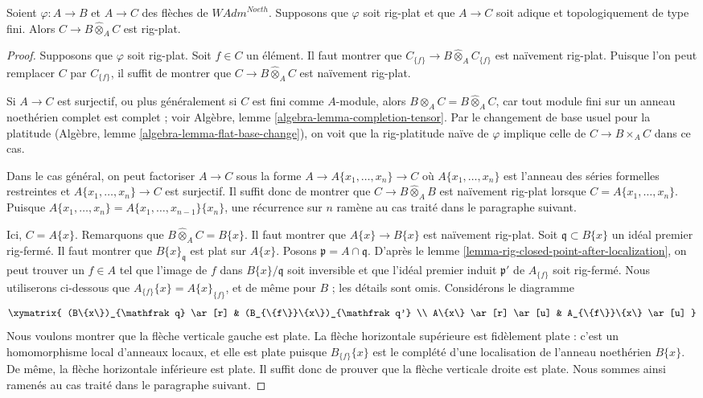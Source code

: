 \begin{lemma}
\label{lemma-rig-flat-base-change}
Soient $\varphi : A \to B$ et $A \to C$ des flèches de $\textit{WAdm}^{Noeth}$.
Supposons que $\varphi$ soit rig-plat et que $A \to C$ soit adique et
topologiquement de type fini. Alors $C \to B \widehat{\otimes}_A C$ est rig-plat.
\end{lemma}

\begin{proof}
Supposons que $\varphi$ soit rig-plat. Soit $f \in C$ un élément.
Il faut montrer que
$C_{\{f\}} \to B \widehat{\otimes}_A C_{\{f\}}$
est naïvement rig-plat. Puisque l'on peut remplacer $C$ par $C_{\{f\}}$,
il suffit de montrer que $C \to B \widehat{\otimes}_A C$
est naïvement rig-plat.

\medskip\noindent
Si $A \to C$ est surjectif, ou plus généralement si $C$ est fini comme
$A$-module, alors $B \otimes_A C = B \widehat{\otimes}_A C$,
car tout module fini sur un anneau noethérien complet est complet ; voir
Algèbre, lemme \ref{algebra-lemma-completion-tensor}.
Par le changement de base usuel pour la platitude
(Algèbre, lemme \ref{algebra-lemma-flat-base-change}),
on voit que la rig-platitude naïve de $\varphi$ implique celle de
$C \to B \times_A C$ dans ce cas.

\medskip\noindent
Dans le cas général, on peut factoriser $A \to C$ sous la forme
$A \to A\{x_1, \ldots, x_n\} \to C$
où $A\{x_1, \ldots, x_n\}$ est l'anneau des séries formelles restreintes
et $A\{x_1, \ldots, x_n\} \to C$ est surjectif. Il
suffit donc de montrer que $C \to B \widehat{\otimes}_A B$ est naïvement
rig-plat lorsque $C = A\{x_1, \ldots, x_n\}$.
Puisque $A\{x_1, \ldots, x_n\} = A\{x_1, \ldots, x_{n - 1}\}\{x_n\}$,
une récurrence sur $n$ ramène au cas traité dans le paragraphe
suivant.

\medskip\noindent
Ici, $C = A\{x\}$. Remarquons que $B \widehat{\otimes}_A C = B\{x\}$.
Il faut montrer que $A\{x\} \to B\{x\}$ est naïvement rig-plat.
Soit $\mathfrak q \subset B\{x\}$ un idéal premier rig-fermé.
Il faut montrer que $B\{x\}_{\mathfrak q}$ est plat sur $A\{x\}$.
Posons $\mathfrak p = A \cap \mathfrak q$.
D'après le lemme \ref{lemma-rig-closed-point-after-localization},
on peut trouver un $f \in A$ tel que
l'image de $f$ dans $B\{x\}/\mathfrak q$ soit inversible et que
l'idéal premier induit $\mathfrak p'$ de $A_{\{f\}}$ soit rig-fermé.
Nous utiliserons ci-dessous que $A_{\{f\}}\{x\} = A\{x\}_{\{f\}}$, et de même
pour $B$ ; les détails sont omis. Considérons le diagramme
$$
\xymatrix{
(B\{x\})_{\mathfrak q} \ar[r] &
(B_{\{f\}}\{x\})_{\mathfrak q'} \\
A\{x\} \ar[r] \ar[u] &
A_{\{f\}}\{x\} \ar[u]
}
$$
Nous voulons montrer que la flèche verticale gauche est plate.
La flèche horizontale supérieure est fidèlement plate : c'est un
homomorphisme local d'anneaux locaux, et elle est plate puisque $B_{\{f\}}\{x\}$
est le complété d'une localisation de l'anneau noethérien
$B\{x\}$. De même, la flèche horizontale inférieure est plate.
Il suffit donc de prouver que la flèche verticale droite est plate.
Nous sommes ainsi ramenés au cas traité dans le paragraphe suivant.


\end{proof}
